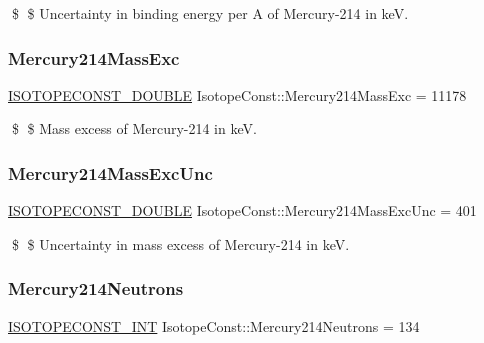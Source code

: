 \$ \$ Uncertainty in binding energy per A of Mercury-\/214 in keV. \mbox{\label{group___isotope_const-_mercury-_hg214_gabc4bef0a49c112c19f504a05135261e4}} 
\subsubsection{\texorpdfstring{Mercury214\+Mass\+Exc}{Mercury214MassExc}}
{\footnotesize\ttfamily \mbox{\hyperlink{group___isotope_const-_macros_ga8f45a7272ce02c0b4c65c44636ed719a}{I\+S\+O\+T\+O\+P\+E\+C\+O\+N\+S\+T\+\_\+\+D\+O\+U\+B\+LE}} Isotope\+Const\+::\+Mercury214\+Mass\+Exc = 11178}

\$ \$ Mass excess of Mercury-\/214 in keV. \mbox{\label{group___isotope_const-_mercury-_hg214_gaeb1b1445cb0b7e156b4c2ebd2eca0498}} 
\subsubsection{\texorpdfstring{Mercury214\+Mass\+Exc\+Unc}{Mercury214MassExcUnc}}
{\footnotesize\ttfamily \mbox{\hyperlink{group___isotope_const-_macros_ga8f45a7272ce02c0b4c65c44636ed719a}{I\+S\+O\+T\+O\+P\+E\+C\+O\+N\+S\+T\+\_\+\+D\+O\+U\+B\+LE}} Isotope\+Const\+::\+Mercury214\+Mass\+Exc\+Unc = 401}

\$ \$ Uncertainty in mass excess of Mercury-\/214 in keV. \mbox{\label{group___isotope_const-_mercury-_hg214_ga6754786766d0471769138d817c2ec27f}} 
\subsubsection{\texorpdfstring{Mercury214\+Neutrons}{Mercury214Neutrons}}
{\footnotesize\ttfamily \mbox{\hyperlink{group___isotope_const-_macros_ga5f18360b3e99483a35c32d789e62621c}{I\+S\+O\+T\+O\+P\+E\+C\+O\+N\+S\+T\+\_\+\+I\+NT}} Isotope\+Const\+::\+Mercury214\+Neutrons = 134}

